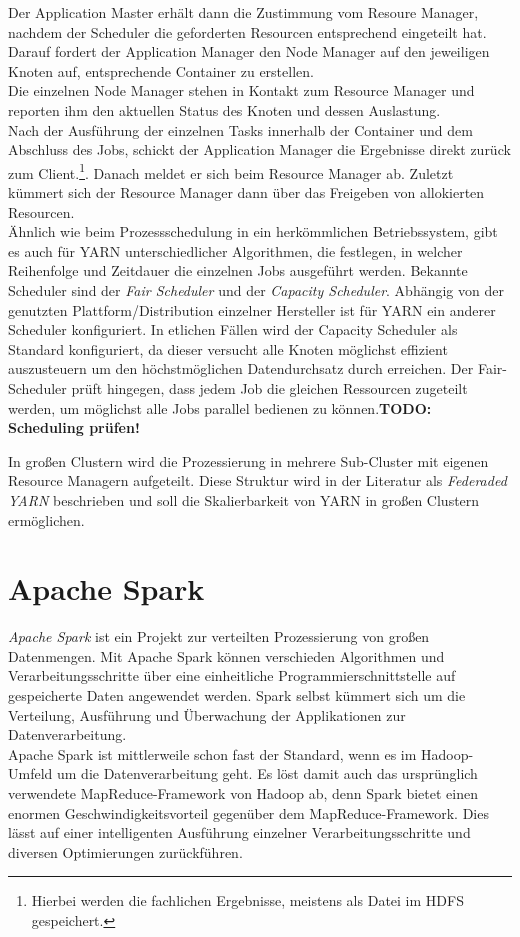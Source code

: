 \noindent
Der Application Master erhält dann die Zustimmung vom Resoure Manager, nachdem der Scheduler die geforderten Resourcen entsprechend eingeteilt hat. Darauf fordert der Application Manager den Node Manager auf den jeweiligen Knoten auf, entsprechende Container zu erstellen.\\
Die einzelnen Node Manager stehen in Kontakt zum Resource Manager und reporten ihm den aktuellen Status des Knoten und dessen Auslastung. \\
Nach der Ausführung der einzelnen Tasks innerhalb der Container und dem Abschluss des Jobs, schickt der Application Manager die Ergebnisse direkt zurück zum Client.\footnote{Hierbei werden die fachlichen Ergebnisse, meistens als Datei im HDFS gespeichert.}. Danach meldet er sich beim Resource Manager ab. Zuletzt kümmert sich der Resource Manager dann über das Freigeben von allokierten Resourcen.\\

\noindent
Ähnlich wie beim Prozessschedulung in ein herkömmlichen Betriebssystem, gibt es auch für YARN unterschiedlicher Algorithmen, die festlegen, in welcher Reihenfolge und Zeitdauer die einzelnen Jobs ausgeführt werden. Bekannte Scheduler sind der \textit{Fair Scheduler} und der \textit{Capacity Scheduler}. Abhängig von der genutzten Plattform/Distribution einzelner Hersteller ist für YARN ein anderer Scheduler konfiguriert. In etlichen Fällen wird der Capacity Scheduler als Standard konfiguriert, da dieser versucht alle Knoten möglichst effizient auszusteuern um den höchstmöglichen Datendurchsatz durch erreichen. Der Fair-Scheduler prüft hingegen, dass jedem Job die gleichen Ressourcen zugeteilt werden, um möglichst alle Jobs parallel bedienen zu können.\textbf{TODO: Scheduling prüfen!}

\noindent
In großen Clustern wird die Prozessierung in mehrere Sub-Cluster mit eigenen Resource Managern aufgeteilt. Diese Struktur wird in der Literatur als \textit{Federaded YARN} beschrieben und soll die Skalierbarkeit von YARN in großen Clustern ermöglichen.

\section{Apache Spark}
\label{sec:theory_spark}

\textit{Apache Spark\texttrademark\thinspace} ist ein Projekt zur verteilten Prozessierung von großen Datenmengen. Mit Apache Spark können verschieden Algorithmen und Verarbeitungsschritte über eine einheitliche Programmierschnittstelle auf gespeicherte Daten  angewendet werden. Spark selbst kümmert sich um die Verteilung, Ausführung und Überwachung der Applikationen zur Datenverarbeitung.\cite[S. 2]{learning_spark}\\
Apache Spark ist mittlerweile schon fast der Standard, wenn es im Hadoop-Umfeld um die Datenverarbeitung geht. Es löst damit auch das ursprünglich verwendete MapReduce-Framework von Hadoop ab, denn Spark
bietet einen enormen Geschwindigkeitsvorteil gegenüber dem MapReduce-Framework. Dies lässt auf einer intelligenten Ausführung einzelner Verarbeitungsschritte und diversen Optimierungen zurückführen.\cite[S. 148 ff.]{expert_hadoop_admin}\\

